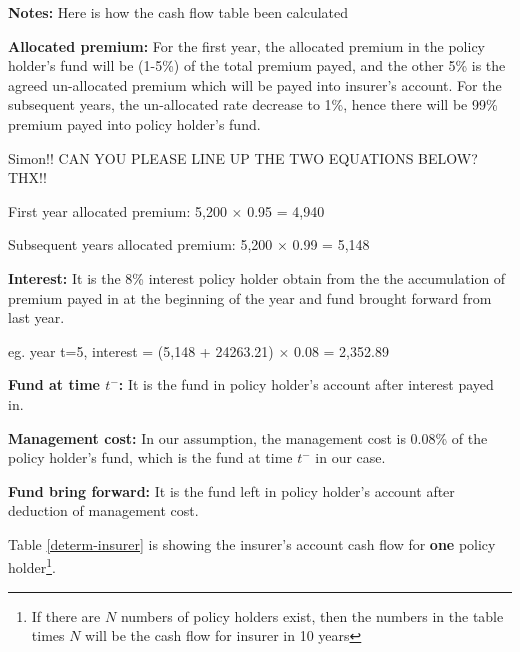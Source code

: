\documentclass{report}
\begin{document}
\textbf{Notes:} Here is how the cash flow table been calculated

\textbf{Allocated premium:} For the first year, the allocated premium in the policy holder's fund will be (1-5\%) of the total premium payed, and the other 5\% is the agreed un-allocated premium which will be payed into insurer's account. For the subsequent years, the un-allocated rate decrease to 1\%, hence there will be 99\% premium payed into policy holder's fund.

Simon!! CAN YOU PLEASE LINE UP THE TWO EQUATIONS BELOW? THX!!


First year allocated premium:                5,200 $\times$ 0.95 = 4,940

Subsequent years allocated premium:   5,200 $\times$ 0.99 = 5,148


\textbf{Interest:} It is the 8\% interest policy holder obtain from the the accumulation of premium payed in at the beginning of the year and fund brought forward from last year.

eg.  year t=5, interest = (5,148 + 24263.21) $\times$ 0.08 = 2,352.89

\textbf{Fund at time $t^-$:} It is the fund in policy holder's account after interest payed in.

\textbf{Management cost:} In our assumption, the management cost is 0.08\% of the policy holder's fund, which is the fund at time $t^-$ in our case. 

\textbf{Fund bring forward:} It is the fund left in policy holder's account after deduction of management cost. 


Table \ref{determ-insurer} is showing the insurer's account cash flow for \textbf{one} policy holder\footnote{If there are $N$ numbers of policy holders exist, then the numbers in the table times $N$ will be the cash flow for insurer in 10 years}. 
\end{document}
